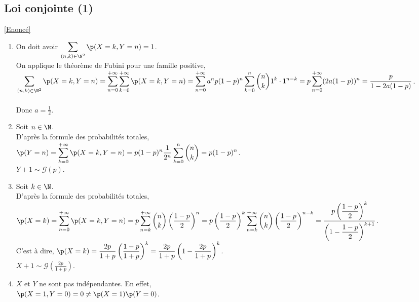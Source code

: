 \documentclass[8pt]{book}
\begin{document}
	\subsection{Loi conjointe (1) }
	\label{Loi conjointe 1 corrigé}
	\textcolor{blue}{\hyperref[Loi conjointe 1]{[Enoncé]}}\\
	\begin{enumerate}
		\item On doit avoir $\displaystyle\sum\limits_{(n,k)\in \N^2}\p(X=k,Y=n)=1$.\\
		On applique le théorème de Fubini pour une famille positive,\\
		$\displaystyle\sum\limits_{(n,k)\in \N^2}\p(X=k,Y=n)=\sum\limits_{n=0}^{+\infty}\sum\limits_{k=0}^{+\infty}\p(X=k,Y=n)=\sum\limits_{n=0}^{+\infty}a^np(1-p)^n\sum\limits_{k=0}^{n}\binom{n}{k}1^k\cdot1^{n-k}=p\sum\limits_{n=0}^{+\infty}(2a(1-p))^n=\frac{p}{1-2a(1-p)}$.\\\\
		Donc $a=\displaystyle\frac{1}{2}$.
		\item Soit $n\in \N$.\\
		D'après la formule des probabilités totales,\\
		$\p(Y=n)=\displaystyle\sum\limits_{k=0}^{+\infty}\p(X=k,Y=n)=p(1-p)^n\frac{1}{2^n}\sum\limits_{k=0}^{n}\binom{n}{k}=p(1-p)^n$.\\
		$Y+1\sim\mathcal{G}(p)$.
		\item Soit $k\in \N$.\\
		D'après la formule des probabilités totales,\\
		$\p(X=k)=\displaystyle\sum\limits_{n=0}^{+\infty}\p(X=k,Y=n)=p\sum\limits_{n=k}^{+\infty}\binom{n}{k}\left(\frac{1-p}{2}\right)^n=p\left(\frac{1-p}{2}\right)^k\sum\limits_{n=k}^{+\infty}\binom{n}{k}\left(\frac{1-p}{2}\right)^{n-k}=\frac{p\left(\displaystyle\frac{1-p}{2}\right)^k}{\left(1-\displaystyle\frac{1-p}{2}\right)^{k+1}}$.\\
		C'est à dire, $\p(X=k)=\displaystyle\frac{2p}{1+p}\left(\frac{1-p}{1+p}\right)^k=\frac{2p}{1+p}\left(1-\frac{2p}{1+p}\right)^k$.\\
		$X+1\sim\mathcal{G}\left(\displaystyle\frac{2p}{1+p}\right)$.
		\item $X$ et $Y$ ne sont pas indépendantes. En effet,\\
		$\p(X=1,Y=0)=0\ne \p(X=1)\p(Y=0)$.
	\end{enumerate}
	
\end{document}
